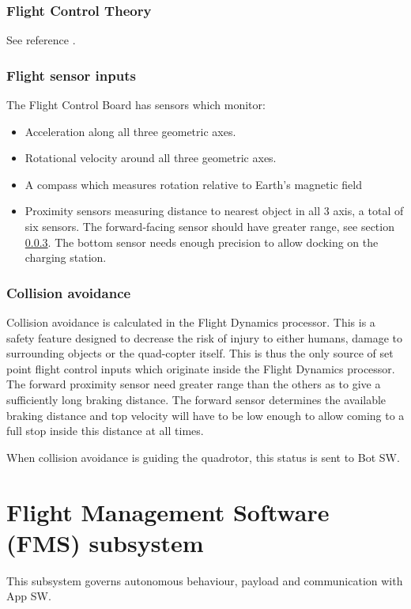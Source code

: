 \documentclass[a4paper]{article}
\begin{document}
  \subsubsection{Flight Control Theory}
  See reference \cite{fcb}.

  \subsubsection{Flight sensor inputs}
  \label{sec:flight-sensor-inputs}
  The Flight Control Board has sensors which monitor:
  \begin{itemize}
    \item Acceleration along all three geometric axes.
    \item Rotational velocity around all three geometric axes.
    \item A compass which measures rotation relative to Earth's magnetic field
    \item Proximity sensors measuring distance to nearest object in all 3 axis, a total of six sensors. The forward-facing sensor should have greater range, see section \ref{sec:collision-avoidance}. The bottom sensor needs enough precision to allow docking on the charging station.
  \end{itemize}
  \subsubsection{Collision avoidance}
  \label{sec:collision-avoidance}
  Collision avoidance is calculated in the Flight Dynamics processor. This is a safety feature designed to decrease the risk of injury to either humans, damage to surrounding objects or the quad-copter itself. This is thus the only source of set point flight control inputs which originate inside the Flight Dynamics processor. The forward proximity sensor need greater range than the others as to give a sufficiently long braking distance. The forward sensor determines the available braking distance and top velocity will have to be low enough to allow coming to a full stop inside this distance at all times.

  When collision avoidance is guiding the quadrotor, this status is sent to Bot SW.

\section{Flight Management Software (FMS) subsystem}
This subsystem governs autonomous behaviour, payload and communication with App SW.
\end{document}
